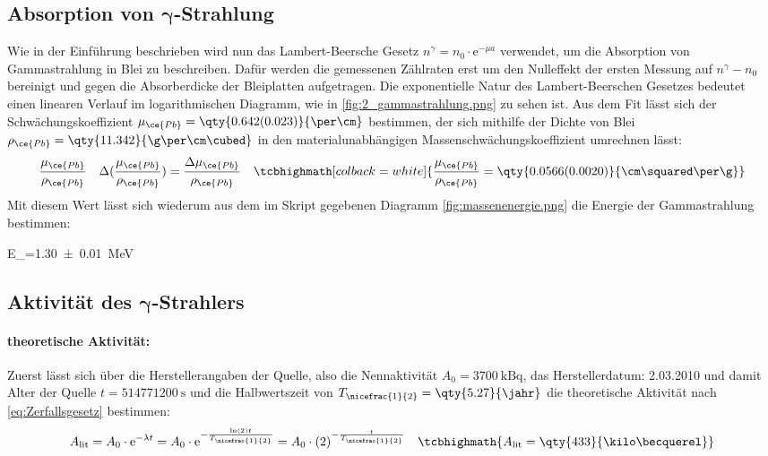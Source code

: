 \subsection[Absorption von Gammastrahlung]{Absorption von \(\boldsymbol{\gamma}\)-Strahlung}
Wie in der Einführung beschrieben wird nun das Lambert-Beersche Gesetz \(n^\gamma=n_0\cdot\mathrm{e}^{-\mu a}\) verwendet, um die Absorption von Gammastrahlung in Blei zu beschreiben. Dafür werden die gemessenen Zählraten erst um den Nulleffekt der ersten Messung auf \(n^\gamma-n_0\) bereinigt und gegen die Absorberdicke der Bleiplatten aufgetragen. Die exponentielle Natur des Lambert-Beerschen Gesetzes bedeutet einen linearen Verlauf im logarithmischen Diagramm, wie in \cref{fig:2_gammastrahlung.png} zu sehen ist. Aus dem Fit lässt sich der Schwächungskoeffizient \(\mu_{\ce{Pb}}=\qty{0.642(0.023)}{\per\cm}\) bestimmen, der sich mithilfe der Dichte von Blei\autocite{Bleidichte} \(\rho_{\ce{Pb}}=\qty{11.342}{\g\per\cm\cubed}\) in den materialunabhängigen Massenschwächungskoeffizient umrechnen lässt:
\begin{align}
    \frac{\mu_{\ce{Pb}}}{\rho_{\ce{Pb}}}&&\Delta (\frac{\mu_{\ce{Pb}}}{\rho_{\ce{Pb}}})=\frac{\Delta \mu_{\ce{Pb}}}{\rho_{\ce{Pb}}}&&\tcbhighmath[colback=white]{\frac{\mu_{\ce{Pb}}}{\rho_{\ce{Pb}}}=\qty{0.0566(0.0020)}{\cm\squared\per\g}}
\end{align}
Mit diesem Wert lässt sich wiederum aus dem im Skript gegebenen Diagramm \ref{fig:massenenergie.png} die Energie der Gammastrahlung bestimmen:
\begin{rb}
    E_\gamma=\qty{1.30(1)}{\mega\electronvolt}
\end{rb}
\FloatBarrier

\subsection[Aktivität des Gammastrahlers]{Aktivität des \(\boldsymbol{\gamma}\)-Strahlers}
\paragraph{theoretische Aktivität:} Zuerst lässt sich über die Herstellerangaben der Quelle, also die Nennaktivität \(A_0=\qty{3700}{\kilo\becquerel}\), das Herstellerdatum: 2.03.2010 und damit Alter der Quelle\autocite{timecalculater} \(t=\qty{514 771 200}{\s}\) und die Halbwertszeit von  \(T_{\nicefrac{1}{2}}=\qty{5.27}{\jahr}\) die theoretische Aktivität\autocite{Aktivität} nach \cref{eq:Zerfallsgesetz} bestimmen:
\begin{align}
    A_{\text{lit}}=A_0\cdot \mathrm{e}^{-\lambda t}=A_0\cdot \mathrm{e}^{-\frac{\ln(2)t}{T_{\nicefrac{1}{2}}}}=A_0\cdot\left(2\right)^{-\frac{t}{T_{\nicefrac{1}{2}}}}&&\tcbhighmath{A_{\text{lit}}=\qty{433}{\kilo\becquerel}}
\end{align}

